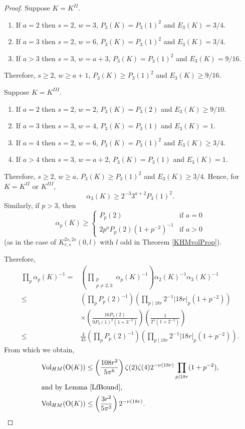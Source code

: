 \documentclass[12pt, a4paper]{article}
\newcommand{\opn}{\operatorname}
\begin{document}
\begin{proof}
  Suppose $K=K^{II}$. \begin{enumerate}
  \item If $a=2$ then $s=2$, $w=3$, $P_3(K) = P_3(1)^2$ and $E_3(K)=3/4$.
  \item If $a=3$ then $s=2$, $w=6$, $P_3(K)=P_3(1)^2$ and $E_3(K) = 3/4$.
  \item If $a>3$ then $s=3$, $w=a+3$, $P_3(K) = P_3(1)^2$ and $E_3(K) = 9/16$.
  \end{enumerate}
  Therefore, $s \geq 2$, $w \geq a+1$, $P_3(K) \geq P_3(1)^2$ and $E_3(K) \geq 9/16$.


  Suppose $K=K^{III}$. \begin{enumerate}
  \item If $a=2$ then $s=2$, $w=2$, $P_3(K) = P_3(2)$ and $E_3(K) \geq 9/10$.
  \item If $a=3$ then $s=3$, $w=4$, $P_3(K) =P_3(1)$ and $E_3(K) = 1$.
  \item If $a=4$ then $s=2$, $w=6$, $P_3(K) = P_3(1)^2$ and $E_3(K) \geq 3/4$.
  \item If $a>4$ then $s=3$, $w = a+2$, $P_3(K) = P_3(1)$ and $E_3(K) =1$.
  \end{enumerate}
  Therefore,
  $s \geq 2$, $w \geq a$, $P_3(K) \geq P_3(1)^2$ and $E_3(K) \geq 3/4$.
  Hence, for $K = K^{II}$ or $K^{III}$,  \[
  \alpha_3(K)
\geq 2^{-3} 3^{a+2} P_3(1)^2.
     \]
Similarly, if $p>3$, then
  \begin{equation*}
    \alpha_p(K) \geq
    \begin{cases}
      P_p(2) & \text{if $a=0$} \\
      2p^a P_p(2) (1 + p^{-2})^{-1} & \text{if $a>0$}
    \end{cases}
  \end{equation*}
  (as in the case of $K_{r,s}^{2s, 2s}(0, l)$ with $l$ odd in Theorem \ref{KHMvolProp}).
  
  Therefore,
  \begin{align*}
    \prod_p \alpha_p(K)^{-1}
    = & 
    \left ( \prod_{\substack{p \\ p \neq 2,3 }} \alpha_p(K)^{-1} \right )
    \alpha_2(K)^{-1} \alpha_3(K)^{-1} \\
    \leq &
    \left (  \prod_p P_p(2)^{-1} \right ) 
    \left ( \prod_{p \mid 18r } 2^{-1} \vert 18r \vert_p (1 + p^{-2} ) \right )
    \\
    & \times  \left ( \frac{16 P_3(2)}{9 P_3(1)^2 (1+3^{-2})} \right) \left( \frac{1}{2^4 (1+2^{-2})}\right ) \\
\leq & \frac{4}{45}
    \left ( \prod_p P_p(2)^{-1} \right )
    \left ( \prod_{p \mid 18r } 2^{-1} \vert 18r \vert_p (1+p^{-2}) \right ).
  \end{align*}
  From which we obtain,
  \begin{align*}
    \opn{Vol}_{HM}(\opn{O}(K))
    & \leq
    \left ( \frac{108 r^2}{5 \pi^6} \right )
    \zeta(2) \zeta(4) 2^{-\nu(18r)} \prod_{p \vert 18r} (1+p^{-2}), \\
    \intertext{and by Lemma \ref{LfBound},}
    \opn{Vol}_{HM}(\opn{O}(K))
    & \leq \left ( \frac{3 r^2}{5 \pi^2} \right ) 2^{-\nu(18r)}. 
  \end{align*}
\end{proof}
\end{document}
